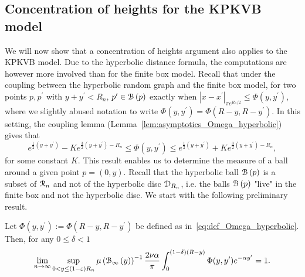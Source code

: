 \subsection{Concentration of heights for the KPKVB model}\label{ssec:average_degree_HP_n}


We will now show that a concentration of heights argument also applies to the KPKVB model. Due to the hyperbolic distance formula, the computations are however more involved than for the finite box model. Recall that under the coupling between the hyperbolic random graph and the finite box model, for two points $p, p^\prime$ with $y + y^\prime < R_n$, $p^\prime \in {\mathcal B}\left(p\right)$ exactly when $|x-x^\prime|_{\pi e^{R_n/2}} \le \Phi(y,y^\prime)$, where we slightly abused notation to write $\Phi(y,y^\prime) = \Phi(R - y, R - y^\prime)$. In this setting, the coupling lemma (Lemma~\ref{lem:asymptotics_Omega_hyperbolic}) gives that  
\[
	e^{\frac{1}{2}(y+y^\prime)} - K e^{\frac{3}{2}(y+y^\prime) - R_n} \leq \Phi(y, y^\prime) 
		\leq  e^{\frac{1}{2}(y+y^\prime)} + K e^{\frac{3}{2}(y+y^\prime) - R_n},
\]
for some constant $K$. This result enables us to determine the measure of a ball around a given point $p=(0,y)$. Recall that the hyperbolic ball ${\mathcal B}\left(p\right)$ is a subset of ${\mathcal R}_n$ and not of the hyperbolic disc ${\mathcal D}_{R_n}$, i.e. the balls ${\mathcal B}\left(p\right)$ "live" in the finite box and not the hyperbolic disc. We start with the following preliminary result.

\begin{lemma}\label{lem:hyperbolic_ball_lower_part}
Let $\Phi(y,y^\prime) := \Phi(R - y,R - y^\prime)$ be defined as in~\eqref{eq:def_Omega_hyperbolic}. Then, for any $0 \le \delta < 1$
\[
	\lim_{n \to \infty} \sup_{0 < y \le (1-\varepsilon)R_n} \mu\left({\mathcal B}_{\infty}\left(y\right)\right)^{-1} \frac{2\nu \alpha}{\pi} \int_0^{(1-\delta)(R-y)} \Phi(y,y^\prime) e^{-\alpha y^\prime} = 1.
\]
\end{lemma}

